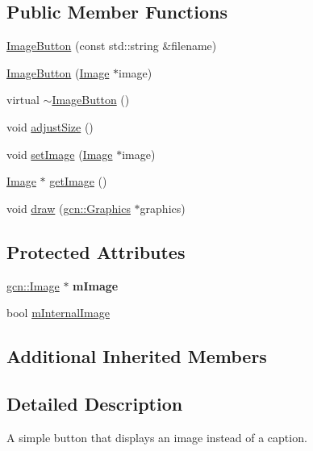 \subsection*{Public Member Functions}
\begin{DoxyCompactItemize}
\item 
\hyperlink{classgcn_1_1ImageButton_a54da62f658134fc699d4ae806f4412e6}{Image\+Button} (const std\+::string \&filename)
\item 
\hyperlink{classgcn_1_1ImageButton_a9186ef6e694608195576ef2bc06e8011}{Image\+Button} (\hyperlink{classgcn_1_1Image}{Image} $\ast$image)
\item 
virtual \hyperlink{classgcn_1_1ImageButton_a0cdce026743d26b826c1be62b69f08cf}{$\sim$\+Image\+Button} ()
\item 
void \hyperlink{classgcn_1_1ImageButton_a5ab1a6bebc05437c4c366989dc2b8f0b}{adjust\+Size} ()
\item 
void \hyperlink{classgcn_1_1ImageButton_ae2c285107583baa3232dee18e3f396a6}{set\+Image} (\hyperlink{classgcn_1_1Image}{Image} $\ast$image)
\item 
\hyperlink{classgcn_1_1Image}{Image} $\ast$ \hyperlink{classgcn_1_1ImageButton_ac1730921714aae0893366137fe775ff0}{get\+Image} ()
\item 
void \hyperlink{classgcn_1_1ImageButton_a067e502ef22fa2f443c575aca9cfe179}{draw} (\hyperlink{classgcn_1_1Graphics}{gcn\+::\+Graphics} $\ast$graphics)
\end{DoxyCompactItemize}
\subsection*{Protected Attributes}
\begin{DoxyCompactItemize}
\item 
\hyperlink{classgcn_1_1Image}{gcn\+::\+Image} $\ast$ {\bfseries m\+Image}\hypertarget{classgcn_1_1ImageButton_afc26c98ffb51c5e5eebc3f101375a6cc}{}\label{classgcn_1_1ImageButton_afc26c98ffb51c5e5eebc3f101375a6cc}

\item 
bool \hyperlink{classgcn_1_1ImageButton_a0e8f9179ab310d84934f1093caa66eb6}{m\+Internal\+Image}
\end{DoxyCompactItemize}
\subsection*{Additional Inherited Members}


\subsection{Detailed Description}
A simple button that displays an image instead of a caption. 

